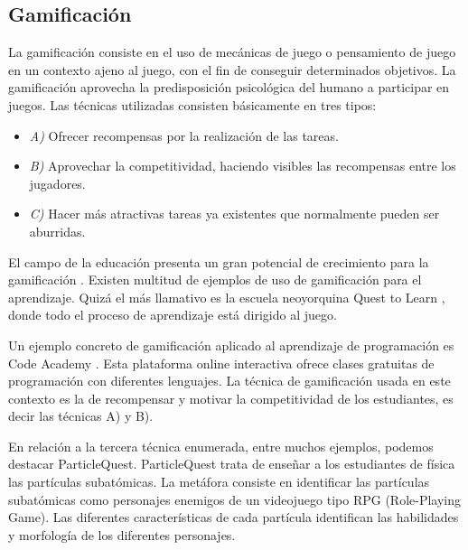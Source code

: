 \documentclass{llncs}
\begin{document}
\subsection{Gamificación}
\label{subsec:gamification}

La gamificación consiste en el uso de mecánicas de juego o pensamiento de juego en un contexto ajeno al juego, con el fin de conseguir determinados objetivos. La gamificación aprovecha la predisposición psicológica del humano a participar en juegos. Las técnicas utilizadas consisten básicamente en tres tipos:
\begin{itemize}
\item {\em A)} Ofrecer recompensas por la realización de las tareas. 
\item {\em B)} Aprovechar la competitividad, haciendo visibles las recompensas entre los jugadores.
\item {\em C)} Hacer más atractivas tareas ya existentes que normalmente pueden ser aburridas. 
\end{itemize}

El campo de la educación presenta un gran potencial de crecimiento para la gamificación \cite{lee2011gamification}. Existen multitud de ejemplos de uso de gamificación para el aprendizaje. Quizá el más llamativo es la escuela neoyorquina Quest to Learn \cite{salen2011quest}, donde todo el proceso de aprendizaje está dirigido al juego. 

Un ejemplo concreto de gamificación aplicado al aprendizaje de programación es Code Academy \cite{codecademy}. Esta plataforma online interactiva ofrece clases gratuitas de programación con diferentes lenguajes. La técnica de gamificación usada en este contexto es la de recompensar y motivar la competitividad de los estudiantes, es decir las técnicas A) y B). 

En relación a la tercera técnica enumerada, entre muchos ejemplos, podemos destacar ParticleQuest. ParticleQuest trata de enseñar a los estudiantes de física las partículas subatómicas. La metáfora consiste en identificar las partículas subatómicas como personajes enemigos de un videojuego tipo RPG (Role-Playing Game). Las diferentes características de cada partícula identifican las habilidades y morfología de los diferentes personajes. 
\end{document}
